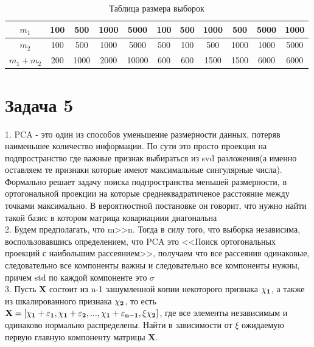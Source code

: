 \documentclass[12pt, twoside]{article}
\begin{document}
\begin{table}[h!]
\begin{center}
\begin{tabular}{|c|c|c|c|c|c|c|c|c|c|c|}
\hline
	$m_1$ & 100 & 500 & 1000 & 5000 & 100 & 500 & 1000 & 500 & 5000 & 1000 \\
	\hline
	$m_2$ & 100 & 500 & 1000 & 5000 & 500 & 100 & 500 & 1000 & 1000 & 5000 \\
	\hline
	$m_1 + m_2$ & 200 & 1000 & 2000 & 10000 & 600 & 600 & 1500 & 1500 & 6000 & 6000 \\
\hline
\end{tabular}
\end{center}
\caption{Таблица размера выборок}
\label{table1}
\end{table}

\section{Задача 5}
1. PCA - это один из способов уменьшение размерности данных, потеряв наименьшее количество информации. По сути это просто проекция на подпространство где важные признак выбираться из svd разложения(а именно оставляем те признаки которые имеют максимальные сингулярные числа). Формально решает задачу поиска подпространства меньшей размерности, в ортогональной проекции на которые среднеквадратиченое расстояние между точками максимально. В вероятностной постановке он говорит, что нужно найти такой базис в котором матрица ковариациии диагональна\\
2. Будем предполагать, что m>>n. Тогда в силу того, что выборка независима, воспользовавшись определением, что PCA это <<Поиск ортогональных проекций с наибольшим рассеянием>>, получаем что все рассеяния одинаковые, следовательно все компоненты важны и следовательно все компоненты нужны, причем std по каждой компоненте это $\sigma$\\
3. Пусть $\textbf{X}$ состоит из n-1 зашумленной копии некоторого признака $\bf{\chi}_1$, а также из шкалированного признака $\bf{\chi}_2$, то есть  $\textbf{X} = [\bf{\chi}_1 +\varepsilon_1, \bf{\chi}_1 +\varepsilon_2, ..., \bf{\chi}_1 +\varepsilon_{n-1}, \xi \bf{\chi}_2]$, где все элементы независимым и одинаково нормально распределены. Найти в зависимости от $\xi$ ожидаемую первую главную компоненту матрицы $\textbf{X}$.\\
\end{document}
